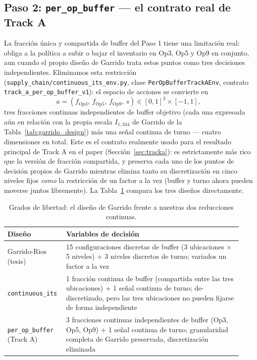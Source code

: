 \documentclass[11pt]{article}
\begin{document}
\subsection{Paso 2: \texttt{per\_op\_buffer} --- el contrato real de Track A}

La fracción única y compartida de buffer del Paso 1 tiene una limitación
real: obliga a la política a subir o bajar el inventario en Op3, Op5 y Op9
en conjunto, aun cuando el propio diseño de Garrido trata estos puntos
como tres decisiones independientes. Eliminamos esta restricción
(\texttt{supply\_chain/continuous\_its\_env.py}, clase
\texttt{PerOpBufferTrackAEnv}, contrato
\texttt{track\_a\_per\_op\_buffer\_v1}): el espacio de acciones se
convierte en
\begin{equation}
a = (f_{\mathrm{Op3}},\, f_{\mathrm{Op5}},\, f_{\mathrm{Op9}},\, s) \in [0,1]^3 \times [-1,1],
\end{equation}
tres fracciones continuas independientes de buffer objetivo (cada una
expresada aún en relación con la propia escala $I_{1{,}344}$ de Garrido de
la Tabla~\ref{tab:garrido_design}) más una señal continua de turno ---
cuatro dimensiones en total. Este es el contrato realmente usado para el
resultado principal de Track A en el paper (Sección~\ref{sec:tracka}): es
estrictamente más rico que la versión de fracción compartida, y preserva
cada uno de los puntos de decisión propios de Garrido mientras elimina
tanto su discretización en cinco niveles fijos \emph{como} la restricción
de un factor a la vez (buffer y turno ahora pueden moverse juntos
libremente). La Tabla~\ref{tab:dof} compara los tres diseños directamente.

\begin{table}[htbp]
\centering
\caption{Grados de libertad: el diseño de Garrido frente a nuestras dos
reducciones continuas.}
\label{tab:dof}
\small
\begin{tabular}{p{0.22\linewidth}p{0.72\linewidth}}
\toprule
Diseño & Variables de decisión \\
\midrule
Garrido-Rios (tesis) & 15 configuraciones discretas de buffer (3
ubicaciones $\times$ 5 niveles) + 3 niveles discretos de turno; variados
un factor a la vez \\
\texttt{continuous\_its} & 1 fracción continua de buffer (compartida entre
las tres ubicaciones) + 1 señal continua de turno; de-discretizado, pero
las tres ubicaciones no pueden fijarse de forma independiente \\
\texttt{per\_op\_buffer} (Track A) & 3 fracciones continuas independientes
de buffer (Op3, Op5, Op9) + 1 señal continua de turno; granularidad
completa de Garrido preservada, discretización eliminada \\
\bottomrule
\end{tabular}
\end{table}
\end{document}

